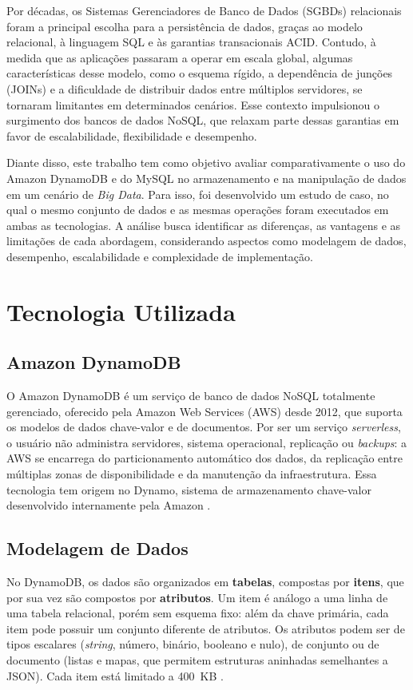 \documentclass[12pt]{article}
\begin{document}
Por décadas, os Sistemas Gerenciadores de Banco de Dados (SGBDs) relacionais
foram a principal escolha para a persistência de dados, graças ao modelo
relacional, à linguagem SQL e às garantias transacionais
ACID. Contudo, à medida que as aplicações passaram a operar em escala global,
algumas características desse modelo, como o esquema rígido, a dependência de
junções (JOINs) e a dificuldade de distribuir dados entre múltiplos servidores,
se tornaram limitantes em determinados cenários. Esse
contexto impulsionou o surgimento dos bancos de dados NoSQL, que relaxam
parte dessas garantias em favor de escalabilidade, flexibilidade e desempenho.

Diante disso, este trabalho tem como objetivo avaliar comparativamente o uso
do Amazon DynamoDB e do MySQL no armazenamento e na manipulação de dados em
um cenário de \textit{Big Data}. Para isso, foi desenvolvido um estudo de
caso, no qual o
mesmo conjunto de dados e as mesmas operações foram executados em ambas as
tecnologias. A análise busca identificar as diferenças, as vantagens e as
limitações de cada abordagem, considerando aspectos como modelagem de dados,
desempenho, escalabilidade e complexidade de implementação.


\section{Tecnologia Utilizada}
\subsection{Amazon DynamoDB}

O Amazon DynamoDB é um serviço de banco de dados NoSQL totalmente gerenciado,
oferecido pela Amazon Web Services (AWS) desde 2012, que suporta os modelos de
dados chave-valor e de documentos. Por ser um serviço \textit{serverless}, o
usuário não administra servidores, sistema operacional, replicação ou
\textit{backups}: a AWS se encarrega do particionamento automático dos dados,
da replicação entre múltiplas zonas de disponibilidade e da manutenção da
infraestrutura. Essa tecnologia tem origem no Dynamo, sistema de armazenamento chave-valor
desenvolvido internamente pela Amazon \cite{decandia2007dynamo}.

\subsection{Modelagem de Dados}

No DynamoDB, os dados são organizados em \textbf{tabelas}, compostas por
\textbf{itens}, que por sua vez são compostos por \textbf{atributos}. Um item
é análogo a uma linha de uma tabela relacional, porém sem esquema fixo: além
da chave primária, cada item pode possuir um conjunto diferente de atributos.
Os atributos podem ser de tipos escalares (\textit{string}, número, binário,
booleano e nulo), de conjunto ou de documento (listas e mapas, que permitem
estruturas aninhadas semelhantes a JSON). Cada item está limitado a 400~KB
\cite{awsdynamodbdocs}.
\end{document}
